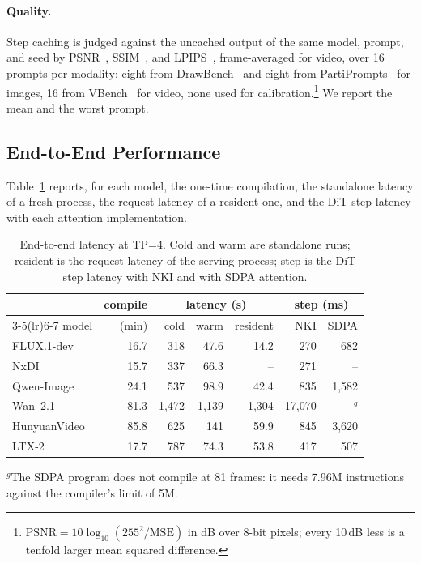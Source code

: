 \paragraph{Quality.}
Step caching is judged against the uncached output of the same model, prompt, and seed by PSNR~\cite{wang2009mse}, SSIM~\cite{ssim}, and LPIPS~\cite{lpips}, frame-averaged for video, over 16 prompts per modality: eight from DrawBench~\cite{drawbench-imagen} and eight from PartiPrompts~\cite{partiprompts} for images, 16 from VBench~\cite{vbench} for video, none used for calibration.\footnote{$\mathrm{PSNR} = 10 \log_{10}(255^2/\mathrm{MSE})$ in dB over 8-bit pixels; every 10\,dB less is a tenfold larger mean squared difference.} We report the mean and the worst prompt.

\subsection{End-to-End Performance}
\label{sec:eval-e2e}

Table~\ref{tab:e2e} reports, for each model, the one-time compilation, the standalone latency of a fresh process, the request latency of a resident one, and the DiT step latency with each attention implementation.

\begin{table}[t]
\caption{End-to-end latency at TP=4. Cold and warm are standalone runs; resident is the request latency of the serving process; step is the DiT step latency with NKI and with SDPA attention.}
\label{tab:e2e}
\centering
\footnotesize
\setlength{\tabcolsep}{2.2pt}
\begin{tabular}{@{}lrrrrrr@{}}
\toprule
& compile & \multicolumn{3}{c}{latency (s)} & \multicolumn{2}{c}{step (ms)} \\
\cmidrule(lr){3-5}\cmidrule(lr){6-7}
model & (min) & cold & warm & resident & NKI & SDPA \\
\midrule
FLUX.1-dev   & 16.7  & 318   & 47.6  & 14.2  & 270     & 682 \\
\quad NxDI   & 15.7  & 337   & 66.3  & --    & 271     & -- \\
Qwen-Image   & 24.1  & 537   & 98.9  & 42.4  & 835     & 1{,}582 \\
Wan~2.1      & 81.3  & 1{,}472 & 1{,}139 & 1{,}304 & 17{,}070 & --$^{g}$ \\
HunyuanVideo & 85.8  & 625   & 141   & 59.9  & 845     & 3{,}620 \\
LTX-2        & 17.7  & 787   & 74.3  & 53.8  & 417     & 507 \\
\bottomrule
\end{tabular}
\par\smallskip
{\raggedright\scriptsize $^{g}$The SDPA program does not compile at 81 frames: it needs 7.96M instructions against the compiler's limit of 5M.\par}
\vskip -0.1in
\end{table}

